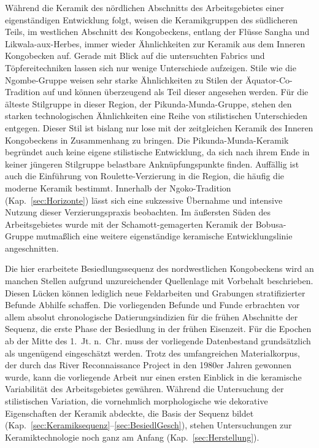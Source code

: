 \begin{multicols}{2}
Während die Keramik des nördlichen Abschnitts des Arbeitsgebietes einer eigenständigen Entwicklung folgt, weisen die Keramikgruppen des südlicheren Teils, im westlichen Abschnitt des Kongobeckens, entlang der Flüsse Sangha und Likwala-aux-Herbes, immer wieder Ähnlichkeiten zur Keramik aus dem Inneren Kongobecken auf. Gerade mit Blick auf die untersuchten Fabrics und Töpfereitechniken lassen sich nur wenige Unterschiede aufzeigen. Stile wie die Ngombe-Gruppe weisen sehr starke Ähnlichkeiten zu Stilen der Äquator-Co-Tradition auf und können überzeugend als Teil dieser angesehen werden. Für die älteste Stilgruppe in dieser Region, der Pikunda-Munda-Gruppe, stehen den starken technologischen Ähnlichkeiten eine Reihe von stilistischen Unterschieden entgegen. Dieser Stil ist bislang nur lose mit der zeitgleichen Keramik des Inneren Kongobeckens in Zusammenhang zu bringen. Die Pikunda-Munda-Keramik begründet auch keine eigene stilistische Entwicklung, da sich nach ihrem Ende in keiner jüngeren Stilgruppe belastbare Anknüpfungspunkte finden. Auffällig ist auch die Einführung von Roulette-Verzierung in die Region, die häufig die moderne Keramik bestimmt. Innerhalb der Ngoko-Tradition (Kap.~\ref{sec:Horizonte}) lässt sich eine sukzessive Übernahme und intensive Nutzung dieser Verzierungspraxis beobachten. Im äußersten Süden des Arbeitsgebietes wurde mit der Schamott-gemagerten Keramik der Bobusa-Gruppe mutmaßlich eine weitere eigenständige keramische Entwicklungslinie angeschnitten.

Die hier erarbeitete Besiedlungssequenz des nordwestlichen Kongobeckens wird an manchen Stellen aufgrund unzureichender Quellenlage mit Vorbehalt beschrieben. Diesen Lücken können lediglich neue Feldarbeiten und Grabungen stratifizierter Befunde Abhilfe schaffen. Die vorliegenden Befunde und Funde erbrachten vor allem absolut chronologische Datierungsindizien für die frühen Abschnitte der Sequenz, die erste Phase der Besiedlung in der frühen Eisenzeit.  Für die Epochen ab der Mitte des 1.~Jt. n.~Chr. muss der vorliegende Datenbestand grundsätzlich als ungenügend eingeschätzt werden. Trotz des umfangreichen Materialkorpus, der durch das River Reconnaissance Project in den 1980er Jahren gewonnen wurde, kann die vorliegende Arbeit nur einen ersten Einblick in die keramische Variabilität des Arbeitsgebietes gewähren. Während die Untersuchung der stilistischen Variation, die vornehmlich morphologische wie dekorative Eigenschaften der Keramik abdeckte, die Basis der Sequenz bildet (Kap.~\ref{sec:Keramiksequenz}--\ref{sec:BesiedlGesch}), stehen Untersuchungen zur Keramiktechnologie noch ganz am Anfang (Kap.~\ref{sec:Herstellung}).
\end{multicols}

